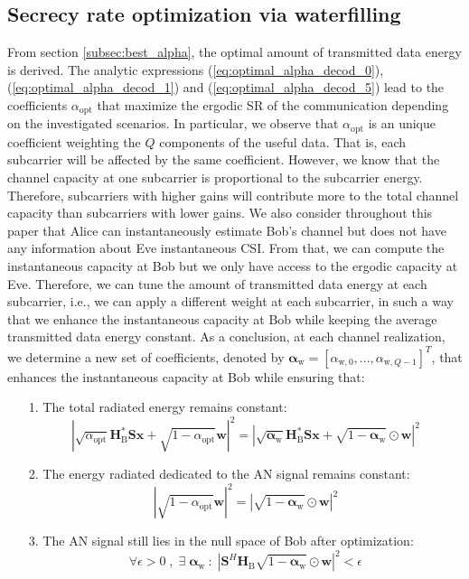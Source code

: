 \documentclass[journal,comsoc]{IEEEtran}
\newcommand{\module}[1]{\left|#1\right|}
\newcommand{\HB}{\textbf{H}_{\text{B}}}
\newcommand{\spread}{\textbf{S}}
\newcommand{\w}{\textbf{w}}
\begin{document}
\subsection{Secrecy rate optimization via waterfilling}
\label{subsec:perf_waterf}
From section \ref{subsec:best_alpha}, the optimal amount of transmitted data energy is derived. The analytic expressions (\ref{eq:optimal_alpha_decod_0}), (\ref{eq:optimal_alpha_decod_1}) and (\ref{eq:optimal_alpha_decod_5}) lead to the coefficients $\alpha_{\text{opt}}$ that maximize the ergodic SR of the communication depending on the investigated scenarios.
In particular, we observe that $\alpha_{\text{opt}}$ is an unique coefficient weighting the $Q$ components of the useful data. That is, each subcarrier will be affected by the same coefficient. However, we know that the channel capacity at one subcarrier is proportional to the subcarrier energy. Therefore, subcarriers with higher gains will contribute more to the total channel capacity than subcarriers with lower gains. We also consider throughout this paper that Alice can instantaneously estimate Bob's channel but does not have any information about Eve instantaneous CSI. From that, we can compute the instantaneous capacity at Bob but we only have access to the ergodic capacity at Eve. Therefore, we can tune the amount of transmitted data energy at each subcarrier, i.e., we can apply a different weight at each subcarrier, in such a way that we enhance the instantaneous capacity at Bob while keeping the average transmitted data energy constant. As a conclusion, at each channel realization, we determine a new set of coefficients, denoted by $\boldsymbol\alpha_{\text{w}} = [\alpha_{\text{w},0},...,\alpha_{\text{w},Q-1}]^T $, that enhances the instantaneous capacity at Bob while ensuring that:
\begin{itemize}
	\item[1.] The total radiated energy remains constant:
	\begin{equation}
	\module{\sqrt{\alpha_{\text{opt}}} \HB^* \spread \textbf{x} + \sqrt{1-\alpha_{\text{opt}}}  \w }^2  =   \module{\sqrt{\boldsymbol\alpha_{\text{w}}}  \HB^* \spread \textbf{x} + \sqrt{1-\boldsymbol\alpha_{\text{w}}} \odot  \w }^2
	\end{equation}
	\item[2.] The energy radiated dedicated to the AN signal remains constant:
	\begin{equation}
	\module{\sqrt{1-\alpha_{\text{opt}}}\w}^2 = \module{\sqrt{1-\boldsymbol\alpha_{\text{w}}} \odot\w}^2
	\end{equation}
	\item[3.] The AN signal still lies in the null space of Bob after optimization:
	\begin{equation}
	\forall \epsilon > 0 \; , \; \exists \;  \boldsymbol\alpha_{\text{w}} \: : \; \left|\spread^H \HB \sqrt{1-\boldsymbol\alpha_{\text{w}}}\odot \w\right|^2 < \epsilon
	\end{equation}
\end{itemize}
\end{document}
